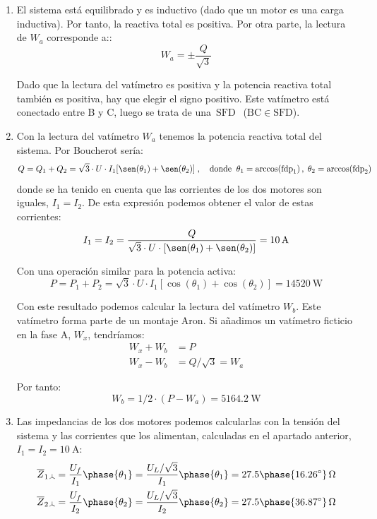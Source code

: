 \begin{enumerate}
\item El sistema está equilibrado y es inductivo (dado que un motor es una carga inductiva). Por tanto, la reactiva total es positiva. Por otra parte, la lectura de $W_a$ corresponde a::
  \[
    W_a = \pm \frac{Q}{\sqrt{3}}
  \]

  Dado que la lectura del vatímetro es positiva y la potencia reactiva total también es positiva, hay que elegir el signo positivo. Este vatímetro está conectado entre B y C, luego se trata de una $\boxed{\, \mathrm{SFD} \,} \;$ ($\mathrm{BC} \in \mathrm{SFD}$).
  
\item Con la lectura del vatímetro $W_a$ tenemos la potencia reactiva total del sistema. Por Boucherot sería:
  \[
    Q = Q_1 + Q_2 = \sqrt{3} \cdot U \cdot I_1 [\sen(\theta_1) + \sen(\theta_2)] \; , \quad \textrm{donde} \;\; \theta_1 = \arccos(\mathrm{fdp}_1) \, , \; \theta_2 = \arccos(\mathrm{fdp}_2)
  \]
  donde se ha tenido en cuenta que las corrientes de los dos motores son iguales, $I_1 = I_2$. De esta expresión podemos obtener el valor de estas corrientes:
  \[
    I_1 = I_2 = \frac{Q}{\sqrt{3} \cdot U \cdot [\sen(\theta_1) + \sen(\theta_2)]} = \qty{10}{\ampere}
  \]

  Con una operación similar para la potencia activa:
  \[
    P = P_1 + P_2 = \sqrt{3} \cdot U \cdot I_1 [\cos(\theta_1) + \cos(\theta_2)] = \qty{14520}{\watt}
  \]

  Con este resultado podemos calcular la lectura del vatímetro $W_b$. Este vatímetro forma parte de un montaje Aron. Si añadimos un vatímetro ficticio en la fase A, $W_x$, tendríamos:
  \begin{align*}
    W_x + W_b &= P\\
    W_x - W_b &= Q/\sqrt{3} = W_a
  \end{align*}

  Por tanto:
  \[
    W_b = 1/2 \cdot (P - W_a) = \qty{5164.2}{\watt}
  \]
  
\item Las impedancias de los dos motores podemos calcularlas con la tensión del sistema y las corrientes que los alimentan, calculadas en el apartado anterior, $I_1 = I_2 = \qty{10}{\ampere}$:
    \begin{align*}
      \overline{Z}_{1\wye} &= \frac{U_f}{I_1}\phase{\theta_1} = \frac{U_L / \sqrt3}{I_1}\phase{\theta_1} = 27.5\phase{\ang{16.26}}\,\unit{\ohm}\\
      \overline{Z}_{2\wye} &= \frac{U_f}{I_2}\phase{\theta_2} = \frac{U_L / \sqrt3}{I_2}\phase{\theta_2} = 27.5\phase{\ang{36.87}}\,\unit{\ohm}
  \end{align*}


\end{enumerate}
